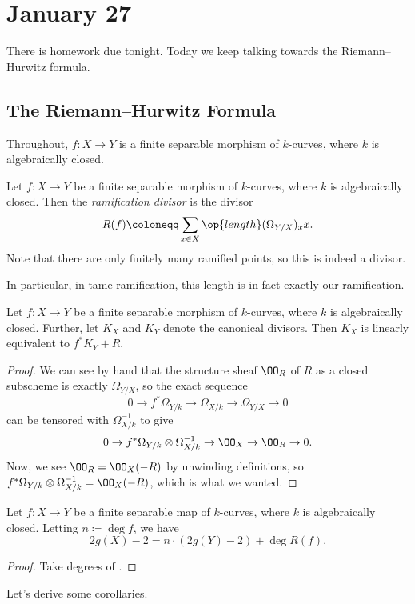 \documentclass[../notes.tex]{subfiles}
\begin{document}
\section{January 27}

There is homework due tonight. Today we keep talking towards the Riemann--Hurwitz formula.

\subsection{The Riemann--Hurwitz Formula}
Throughout, $f\colon X\to Y$ is a finite separable morphism of $k$-curves, where $k$ is algebraically closed.
\begin{definition}
	Let $f\colon X\to Y$ be a finite separable morphism of $k$-curves, where $k$ is algebraically closed. Then the \textit{ramification divisor} is the divisor
	\[R(f)\coloneqq\sum_{x\in X}\op{length}(\Omega_{Y/X})_xx.\]
	Note that there are only finitely many ramified points, so this is indeed a divisor.
\end{definition}
In particular, in tame ramification, this length is in fact exactly our ramification.
\begin{lemma} \label{lem:use-ramification}
	Let $f\colon X\to Y$ be a finite separable morphism of $k$-curves, where $k$ is algebraically closed. Further, let $K_X$ and $K_Y$ denote the canonical divisors. Then $K_X$ is linearly equivalent to $f^*K_Y+R$.
\end{lemma}
\begin{proof}
	We can see by hand that the structure sheaf $\OO_R$ of $R$ as a closed subscheme is exactly $\Omega_{Y/X}$, so the exact sequence
	\[0\to f^*\Omega_{Y/k}\to\Omega_{X/k}\to\Omega_{Y/X}\to0\]
	can be tensored with $\Omega_{X/k}^{-1}$ to give
	\[0\to f^*\Omega_{Y/k}\otimes\Omega_{X/k}^{-1}\to\OO_X\to\OO_R\to0.\]
	Now, we see $\OO_R=\OO_X(-R)$ by unwinding definitions, so $f^*\Omega_{Y/k}\otimes\Omega_{X/k}^{-1}=\OO_X(-R)$, which is what we wanted.
\end{proof}
\begin{theorem}[Hurwitz] \label{thm:rh}
	Let $f\colon X\to Y$ be a finite separable map of $k$-curves, where $k$ is algebraically closed. Letting $n\coloneqq\deg f$, we have
	\[2g(X)-2=n\cdot(2g(Y)-2)+\deg R(f).\]
\end{theorem}
\begin{proof}
	Take degrees of .
\end{proof}
Let's derive some corollaries.
\end{document}
